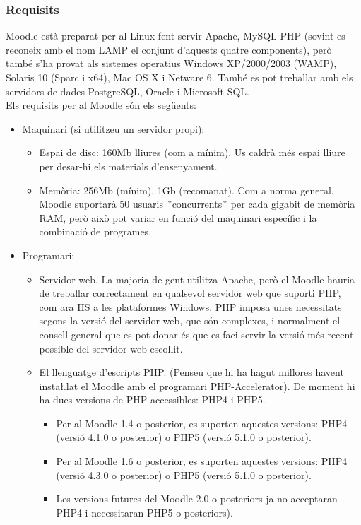 \documentclass[a4paper]{report}  %
\begin{document}
\subsubsection{Requisits}
Moodle està preparat per al Linux fent servir Apache, MySQL PHP (sovint es reconeix amb el nom LAMP el conjunt d'aquests quatre components), però també s'ha provat als sistemes operatius Windows XP/2000/2003 (WAMP), Solaris 10 (Sparc i x64), Mac OS X i Netware 6. També es pot treballar amb els servidors de dades PostgreSQL, Oracle i Microsoft SQL.\\
Els requisits per al Moodle són els següents:
\begin{itemize}
   \item Maquinari (si utilitzeu un servidor propi):
   \begin{itemize}
   	\item Espai de disc: 160Mb lliures (com a mínim). Us caldrà més espai lliure per desar-hi els materials d'ensenyament. 
		\item Memòria: 256Mb (mínim), 1Gb (recomanat). Com a norma general, Moodle suportarà 50 usuaris $"$concurrents$"$ per cada gigabit de memòria RAM, però això pot variar en funció del maquinari específic i la combinació de programes. 
	\end{itemize}
	\item Programari: 
	\begin{itemize}
		\item Servidor web. La majoria de gent utilitza Apache, però el Moodle hauria de treballar correctament en qualsevol servidor web que suporti PHP, com ara IIS a les plataformes Windows. PHP imposa unes necessitats segons la versió del servidor web, que són complexes, i normalment el consell general que es pot donar és que es faci servir la versió més recent possible del servidor web escollit. 
		\item El llenguatge d'escripts PHP. (Penseu que hi ha hagut millores havent insta\l.lat el Moodle amb el programari PHP-Accelerator). De moment hi ha dues versions de PHP accessibles: PHP4 i PHP5. 
			\begin{itemize}
			\item Per al Moodle 1.4 o posterior, es suporten aquestes versions: PHP4 (versió 4.1.0 o posterior) o PHP5 (versió 5.1.0 o posterior). 
			\item Per al Moodle 1.6 o posterior, es suporten aquestes versions: PHP4 (versió 4.3.0 o posterior) o PHP5 (versió 5.1.0 o posterior). 
			\item Les versions futures del Moodle 2.0 o posteriors ja no acceptaran PHP4 i necessitaran PHP5 o posteriors). 

\end{itemize}
\end{itemize}
\end{itemize}
\end{document}
